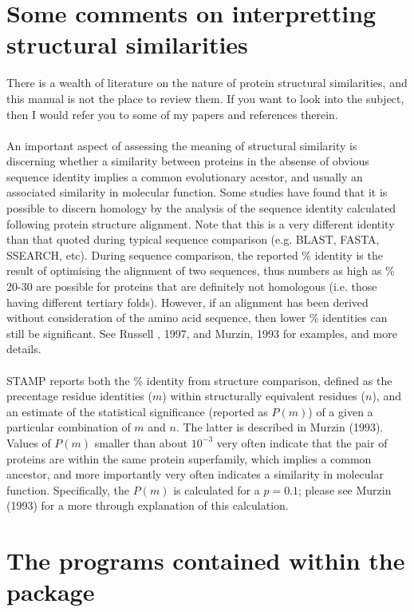 \section{Some comments on interpretting structural similarities}

There is a wealth of literature on the nature of protein structural similarities, 
and this manual is not the place to review them.  If you want to look into
the subject, then I would refer you to some of my papers \cite{rb94,russell97b,russell98a}
and references therein.\\
\\
An important aspect of assessing the meaning of structural similarity is discerning whether
a similarity between proteins in the absense of obvious sequence identity implies a common
evolutionary acestor, and usually an associated similarity in molecular function.  Some studies
have found that it is possible to discern homology by the analysis of the sequence identity
calculated following protein structure alignment.  Note that this is a very different 
identity than that quoted during typical sequence comparison (e.g. BLAST, FASTA, SSEARCH, etc).
During sequence comparison, the reported \% identity is the result of optimising the alignment of
two sequences, thus numbers as high as \% 20-30 are possible for proteins that are definitely
not homologous (i.e. those having different tertiary folds).  However, if an alignment has been
derived without consideration of the amino acid sequence, then lower \% identities can still
be significant.  See Russell \ea, 1997, and Murzin, 1993 for examples, and more details.\\ 
\\
\nocite{murzin93}
STAMP reports both the \% identity from structure comparison, defined as the precentage 
residue identities ($m$) within structurally equivalent residues ($n$), and an estimate of the statistical
significance (reported as $P(m)$) of a given a particular combination of $m$ and $n$.  The latter is
described in Murzin (1993).  Values of $P(m)$ smaller than about $10^{-3}$ very often indicate that
the pair of proteins are within the same protein superfamily, which implies a common
ancestor, and more importantly very often indicates a similarity in molecular function.  Specifically,
the $P(m)$ is calculated for a $p = 0.1$; please see Murzin (1993) for a more through explanation
of this calculation.

\section{The programs contained within the package}

